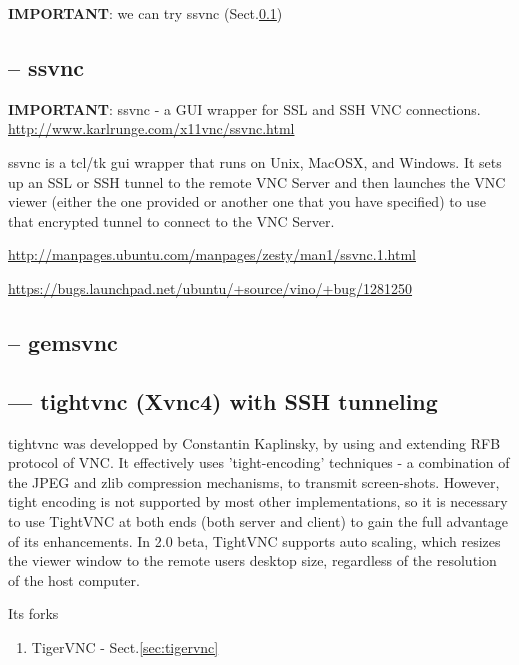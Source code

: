 {\bf IMPORTANT}: we can try ssvnc (Sect.\ref{sec:ssvnc})

\subsection{-- ssvnc}
\label{sec:ssvnc}

{\bf IMPORTANT}: ssvnc - a GUI wrapper for SSL and SSH VNC connections.
\url{http://www.karlrunge.com/x11vnc/ssvnc.html}

 ssvnc  is  a tcl/tk gui wrapper that runs on Unix, MacOSX, and Windows.
       It sets up an SSL or SSH tunnel to  the  remote  VNC  Server  and  then
       launches  the  VNC  viewer (either the one provided or another one that
       you have specified) to use that encrypted tunnel to connect to the  VNC
       Server.   
       
 \url{http://manpages.ubuntu.com/manpages/zesty/man1/ssvnc.1.html}

\url{https://bugs.launchpad.net/ubuntu/+source/vino/+bug/1281250}





\subsection{-- gemsvnc}
\label{sec:gemsvnc}


\subsection{--- tightvnc (Xvnc4) with SSH tunneling}
\label{sec:Xvnc}
\label{sec:tightvnc}
\label{sec:vncserver}
\label{sec:vncserver-Ubuntu}
\label{sec:vncserver-GNOME-1}
\label{sec:vnc-loopback-SSH-tunneling}

tightvnc was developped by Constantin Kaplinsky, by using and extending RFB
protocol of VNC. It effectively uses 'tight-encoding' techniques - a combination
of the JPEG and zlib compression mechanisms, to transmit screen-shots.
However, tight encoding is not supported by most other implementations, so it is
necessary to use TightVNC at both ends (both server and client) to gain the full
advantage of its enhancements.
In 2.0 beta, TightVNC supports auto scaling, which resizes the viewer window to
the remote users desktop size, regardless of the resolution of the host
computer.

Its forks
\begin{enumerate}
  \item TigerVNC - Sect.\ref{sec:tigervnc}
\end{enumerate}


